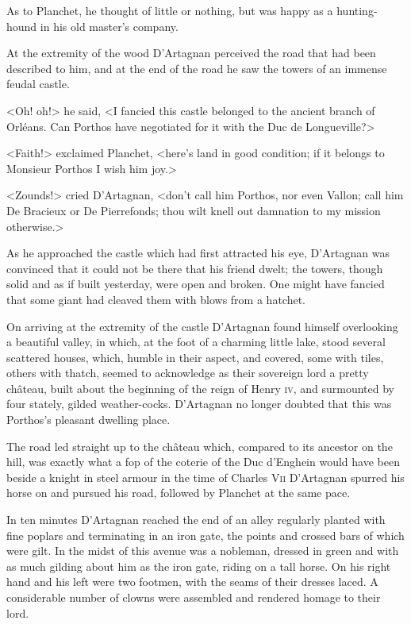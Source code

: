 As to Planchet, he thought of little or nothing, but was happy as a hunting-hound in his old master's company.

At the extremity of the wood D'Artagnan perceived the road that had been described to him, and at the end of the road he saw the towers of an immense feudal castle.

<Oh! oh!> he said, <I fancied this castle belonged to the ancient branch of Orléans. Can Porthos have negotiated for it with the Duc de Longueville?>

<Faith!> exclaimed Planchet, <here's land in good condition; if it belongs to Monsieur Porthos I wish him joy.>

<Zounds!> cried D'Artagnan, <don't call him Porthos, nor even Vallon; call him De Bracieux or De Pierrefonds; thou wilt knell out damnation to my mission otherwise.>

As he approached the castle which had first attracted his eye, D'Artagnan was convinced that it could not be there that his friend dwelt; the towers, though solid and as if built yesterday, were open and broken. One might have fancied that some giant had cleaved them with blows from a hatchet.

On arriving at the extremity of the castle D'Artagnan found himself overlooking a beautiful valley, in which, at the foot of a charming little lake, stood several scattered houses, which, humble in their aspect, and covered, some with tiles, others with thatch, seemed to acknowledge as their sovereign lord a pretty château, built about the beginning of the reign of Henry \textsc{iv}, and surmounted by four stately, gilded weather-cocks. D'Artagnan no longer doubted that this was Porthos's pleasant dwelling place.

The road led straight up to the château which, compared to its ancestor on the hill, was exactly what a fop of the coterie of the Duc d'Enghein would have been beside a knight in steel armour in the time of Charles V\textsc{ii} D'Artagnan spurred his horse on and pursued his road, followed by Planchet at the same pace.

In ten minutes D'Artagnan reached the end of an alley regularly planted with fine poplars and terminating in an iron gate, the points and crossed bars of which were gilt. In the midst of this avenue was a nobleman, dressed in green and with as much gilding about him as the iron gate, riding on a tall horse. On his right hand and his left were two footmen, with the seams of their dresses laced. A considerable number of clowns were assembled and rendered homage to their lord.

